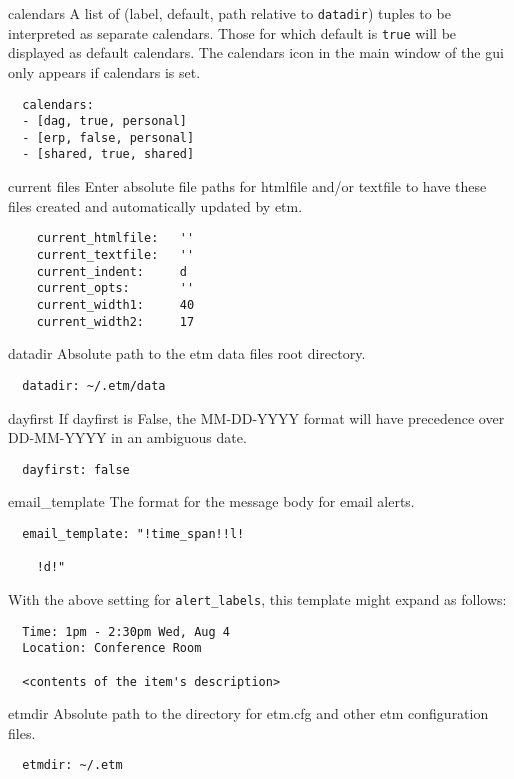 \documentclass[9pt,landscape]{article}
\begin{document}
\begin{multicols}{3}
\begin{compactdesc}
\item[calendars] A list of (label, default, path relative to \verb!datadir!) tuples to be interpreted as separate calendars. Those for which default is \verb!true! will be displayed as default calendars. The calendars icon in the main window of the gui only appears if calendars is set.
\begin{verbatim}
  calendars:
  - [dag, true, personal]
  - [erp, false, personal]
  - [shared, true, shared]
\end{verbatim}

\item[current files] Enter absolute file paths for htmlfile and/or textfile to have these files created and automatically updated by etm.
\begin{verbatim}
    current_htmlfile:   ''
    current_textfile:   ''
    current_indent:     d
    current_opts:       ''
    current_width1:     40
    current_width2:     17
\end{verbatim}

\item[datadir] Absolute path to the etm data files root directory.
\begin{verbatim}
  datadir: ~/.etm/data
\end{verbatim}

\item[dayfirst] If dayfirst is False, the MM-DD-YYYY format will have precedence over DD-MM-YYYY in an ambiguous date.
\begin{verbatim}
  dayfirst: false
\end{verbatim}

\item[email\_template] The format for the message body for email alerts.
\begin{verbatim}
  email_template: "!time_span!!l!

    !d!"
\end{verbatim}
With the above setting for \verb'alert_labels', this template might expand as follows:
\begin{verbatim}
  Time: 1pm - 2:30pm Wed, Aug 4
  Location: Conference Room

  <contents of the item's description>
\end{verbatim}

\item[etmdir] Absolute path to the directory for etm.cfg and other etm configuration files.
\begin{verbatim}
  etmdir: ~/.etm
\end{verbatim}


\end{compactdesc}
\end{multicols}
\end{document}
